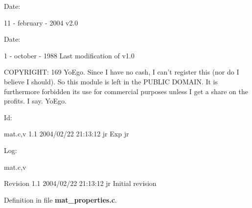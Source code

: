 \begin{Desc}
\item[Date: ]\par
11 - february - 2004 v2.0\end{Desc}
\begin{Desc}
\item[Date: ]\par
1 - october - 1988 Last modification of v1.0\end{Desc}
COPYRIGHT: 169 Yo\-Ego. Since I have no cash, I can't register this (nor do I believe I should). So this module is left in the PUBLIC DOMAIN. It is furthermore forbidden its use for commercial purposes unless I get a share on the profits. I say. Yo\-Ego.

\begin{Desc}
\item[Id: ]\par
 mat.c,v 1.1 2004/02/22 21:13:12 jr Exp jr \end{Desc}
 \begin{Desc}
\item[Log: ]\par
 mat.c,v \end{Desc}
 Revision 1.1 2004/02/22 21:13:12 jr Initial revision



Definition in file {\bf mat\_\-properties.c}.